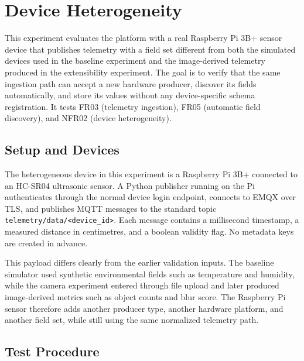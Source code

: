 \section{Device Heterogeneity}
\label{sec:EvalHeterogeneity}

This experiment evaluates the platform with a real Raspberry Pi 3B+ sensor device that publishes telemetry with a field set different from both the simulated devices used in the baseline experiment and the image-derived telemetry produced in the extensibility experiment. The goal is to verify that the same ingestion path can accept a new hardware producer, discover its fields automatically, and store its values without any device-specific schema registration. It tests FR03 (telemetry ingestion), FR05 (automatic field discovery), and NFR02 (device heterogeneity).

\subsection{Setup and Devices}
\label{subsec:EvalHeterogeneitySetup}

The heterogeneous device in this experiment is a Raspberry Pi 3B+ connected to an HC-SR04 ultrasonic sensor. A Python publisher running on the Pi authenticates through the normal device login endpoint, connects to EMQX over TLS, and publishes \gls{MQTT} messages to the standard topic \texttt{telemetry/data/<device\_id>}. Each message contains a millisecond timestamp, a measured distance in centimetres, and a boolean validity flag. No metadata keys are created in advance.

This payload differs clearly from the earlier validation inputs. The baseline simulator used synthetic environmental fields such as temperature and humidity, while the camera experiment entered through file upload and later produced image-derived metrics such as object counts and blur score. The Raspberry Pi sensor therefore adds another producer type, another hardware platform, and another field set, while still using the same normalized telemetry path.

\subsection{Test Procedure}
\label{subsec:EvalHeterogeneityProcedure}

